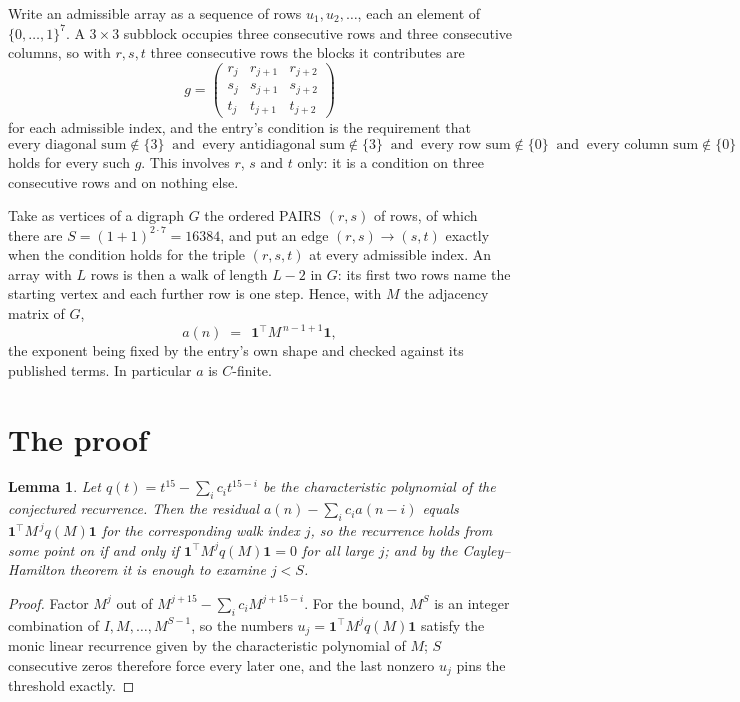 \documentclass[11pt,a4paper]{article}
\theoremstyle{plain}
\newtheorem{lemma}[theorem]{Lemma}
\theoremstyle{definition}
\begin{document}
Write an admissible array as a sequence of rows $u_1,u_2,\dots$, each an element of
$\{0,\dots,1\}^{7}$. A $3\times3$ subblock occupies three consecutive rows and
three consecutive columns, so with $r,s,t$ three consecutive rows the blocks it
contributes are
\[
g=\begin{pmatrix}r_j&r_{j+1}&r_{j+2}\\ s_j&s_{j+1}&s_{j+2}\\ t_j&t_{j+1}&t_{j+2}\end{pmatrix}
\]
for each admissible index, and the entry's condition is the requirement that
\[
\text{every diagonal sum} \notin \{3\}\ \text{ and }\ \text{every antidiagonal sum} \notin \{3\}\ \text{ and }\ \text{every row sum} \notin \{0\}\ \text{ and }\ \text{every column sum} \notin \{0\}
\]
holds for every such $g$. This involves $r$, $s$ and $t$ only: it is a condition on
three consecutive rows and on nothing else.

Take as vertices of a digraph $G$ the ordered PAIRS $(r,s)$ of rows, of which there are
$S=(1+1)^{2\cdot7}=16384$, and put an edge $(r,s)\to(s,t)$ exactly when the condition
holds for the triple $(r,s,t)$ at every admissible index. An array with $L$ rows is then a
walk of length $L-2$ in $G$: its first two rows name the starting vertex and each further
row is one step. Hence, with $M$ the adjacency matrix of $G$,
\[
a(n)\;=\;\,\mathbf{1}^{\!\top}M^{\,n-1+1}\mathbf{1},
\]
the exponent being fixed by the entry's own shape and checked against its published terms.
In particular $a$ is $C$-finite.

\section{The proof}

\begin{lemma}\label{lem:crit}
Let $q(t)=t^{15}-\sum_i c_it^{15-i}$ be the characteristic polynomial of the
conjectured recurrence. Then the residual $a(n)-\sum_ic_ia(n-i)$ equals
$\mathbf{1}^{\!\top}M^{\,j}q(M)\mathbf{1}$ for the corresponding walk index
$j$, so the recurrence holds from some point on if and only if
$\mathbf{1}^{\!\top}M^{j}q(M)\mathbf{1}=0$ for all large $j$; and by the
Cayley--Hamilton theorem it is enough to examine $j<S$.
\end{lemma}

\begin{proof}
Factor $M^{j}$ out of $M^{j+15}-\sum_ic_iM^{j+15-i}$. For the bound, $M^{S}$
is an integer combination of $I,M,\dots,M^{S-1}$, so the numbers
$u_j=\mathbf{1}^{\!\top}M^{j}q(M)\mathbf{1}$ satisfy the monic linear recurrence given by
the characteristic polynomial of $M$; $S$ consecutive zeros therefore force every later one,
and the last nonzero $u_j$ pins the threshold exactly.
\end{proof}
\end{document}
